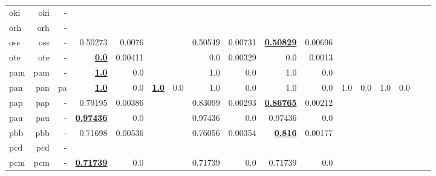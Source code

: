 \documentclass[11pt]{article}
\begin{document}
\begin{table*}[h]
{\begin{tabular}{lrrrrrrrrrrrrrrrr}
oki         & oki         & -         &          &          &          &          &          &          &          &          &          &          &          &          \\
orh         & orh         & -         &          &          &          &          &          &          &          &          &          &          &          &          \\
oss         & oss         & -         & 0.50273         & 0.0076         &          &          & 0.50549         & 0.00731         & \textbf{\underline{0.50829}}         & 0.00696         &          &          &          &          \\
ote         & ote         & -         & \textbf{\underline{0.0}}         & 0.00411         &          &          & 0.0         & 0.00329         & 0.0         & 0.0013         &          &          &          &          \\
pam         & pam         & -         & \textbf{\underline{1.0}}         & 0.0         &          &          & 1.0         & 0.0         & 1.0         & 0.0         &          &          &          &          \\
pan         & pan         & pa         & \textbf{\underline{1.0}}         & 0.0         & \textbf{\underline{1.0}}         & 0.0         & 1.0         & 0.0         & 1.0         & 0.0         & 1.0         & 0.0         & 1.0         & 0.0         \\
pap         & pap         & -         & 0.79195         & 0.00386         &          &          & 0.83099         & 0.00293         & \textbf{\underline{0.86765}}         & 0.00212         &          &          &          &          \\
pau         & pau         & -         & \textbf{\underline{0.97436}}         & 0.0         &          &          & 0.97436         & 0.0         & 0.97436         & 0.0         &          &          &          &          \\
pbb         & pbb         & -         & 0.71698         & 0.00536         &          &          & 0.76056         & 0.00354         & \textbf{\underline{0.816}}         & 0.00177         &          &          &          &          \\
pcd         & pcd         & -         &          &          &          &          &          &          &          &          &          &          &          &          \\
pcm         & pcm         & -         & \textbf{\underline{0.71739}}         & 0.0         &          &          & 0.71739         & 0.0         & 0.71739         & 0.0         &          &          &          &          \\

\end{tabular}}
\end{table*}
\end{document}

